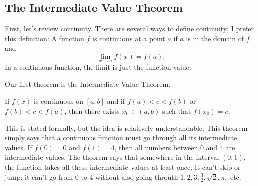 \documentclass[fleqn]{report}
\begin{document}
\subsection{The Intermediate Value Theorem}
\label{ivt}

First, let's review continuity. There are several ways to
define continuity; I prefer this definition: A function $f$ is
continuous at a point $a$ if $a$ is in the domain of $f$ and 
\begin{equation*}
\lim_{x \rightarrow a} f(x) = f(a).
\end{equation*}
In a continuous function, the limit is just the function
value. 

Our first theorem is the Intermediate Value Theorem.
\begin{thm}
If $f(x)$ is continuous on $[a,b]$ and if $f(a) < c < f(b)$ or
$f(b)< c < f(a)$, then there exists $x_0\in (a,b)$ such
that $f(x_0) = c$.
\end{thm}
This is stated formally, but the idea is relatively
understandable. This theorem simply says that a continuous
function must go through all its intermediate values. If
$f(0) = 0 $ and $f(1) = 4$, then all numbers between $0$ and
$4$ are intermediate values. The theorem says that somewhere
in the interval $(0,1)$, the function takes all these
intermediate values at least once. It can't skip or jump: it
can't go from 0 to 4 without also going throuth $1, 2, 3,
\frac{3}{2}, \sqrt{2}, \pi,$ etc. 
\end{document}
